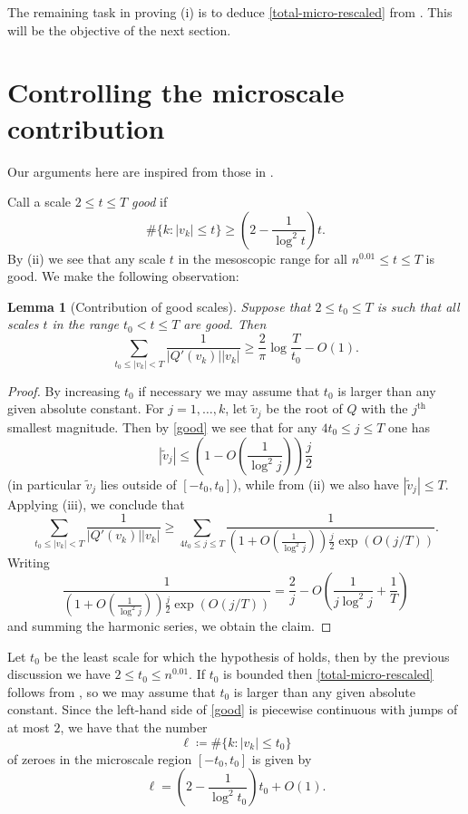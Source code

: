 \documentclass[12pt]{amsart}
\newtheorem{lemma}[theorem]{Lemma}
\begin{document}
The remaining task in proving (i) is to deduce \eqref{total-micro-rescaled} from .  This will be the objective of the next section.

\section{Controlling the microscale contribution}\label{micro-sec}

Our arguments here are inspired from those in \cite{erdos}.

Call a scale $2 \leq t \leq T$ \emph{good} if
\begin{equation}\label{good} \# \{ k: |v_k| \leq t \} \geq \left( 2 - \frac{1}{\log^2 t} \right) t.
\end{equation}
By (ii) we see that any scale $t$ in the mesoscopic range for all $n^{0.01} \leq t \leq T$ is good.  We make the following observation:

\begin{lemma}[Contribution of good scales]\label{good-cont}  Suppose that $2 \leq t_0 \leq T$ is such that all scales $t$ in the range $t_0 < t \leq T$ are good.  Then
$$     \sum_{t_0 \leq |v_k| < T} \frac{1}{|Q'(v_k)| |v_k|} \geq \frac{2}{\pi} \log \frac{T}{t_0} - O(1).$$
\end{lemma}

\begin{proof} By increasing $t_0$ if necessary we may assume that $t_0$ is larger than any given absolute constant. For $j=1,\dots,k$, let $\tilde v_j$ be the root of $Q$ with the $j^{\mathrm{th}}$ smallest magnitude.  Then by \eqref{good} we see that for any $4t_0 \leq j \leq T$ one has
$$ |\tilde v_j| \leq \left( 1 - O\left(\frac{1}{\log^2 j}\right) \right) \frac{j}{2}$$
(in particular $\tilde v_j$ lies outside of $[-t_0,t_0]$), while from (ii) we also have $|\tilde v_j| \leq T$.  Applying (iii), we conclude that
$$     \sum_{t_0 \leq |v_k| < T} \frac{1}{|Q'(v_k)| |v_k|}
\geq \sum_{4t_0 \leq j \leq T} \frac{1}{\left( 1 + O\left(\frac{1}{\log^2 j}\right) \right) \frac{j}{2} \exp( O( j/T )) }.$$
Writing
$$\frac{1}{\left( 1 + O\left(\frac{1}{\log^2 j}\right) \right) \frac{j}{2} \exp( O( j/T )) } = \frac{2}{j} - O\left( \frac{1}{j \log^2 j} + \frac{1}{T} \right)$$
and summing the harmonic series, we obtain the claim.
\end{proof}

Let $t_0$ be the least scale for which the hypothesis of  holds, then by the previous discussion we have $2 \leq t_0 \leq n^{0.01}$.  If $t_0$ is bounded then \eqref{total-micro-rescaled} follows from , so we may assume that $t_0$ is larger than any given absolute constant.  Since the left-hand side of \eqref{good} is piecewise continuous with jumps of at most $2$, we have that the number
$$ \ell \coloneqq \# \{ k: |v_k| \leq t_0 \} $$
of zeroes in the microscale region $[-t_0,t_0]$ is given by
\begin{equation}\label{lcount} \ell = \left( 2 - \frac{1}{\log^2 t_0} \right) t_0 + O(1).
\end{equation}
\end{document}
